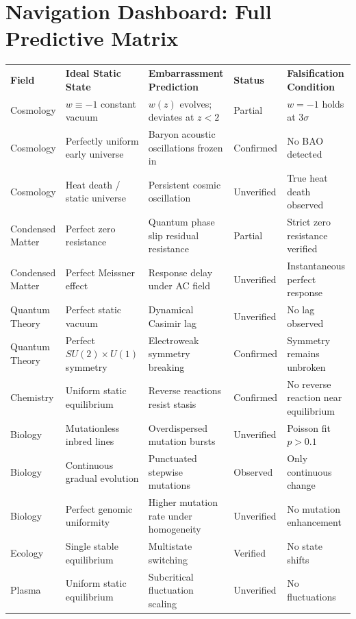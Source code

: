 \documentclass[10pt,a4paper]{article}
\begin{document}
\section*{Navigation Dashboard: Full Predictive Matrix}
\begin{tcolorbox}[title=EMBARRASSMENT PREDICTION DASHBOARD v1.0,colback=white,colframe=black!70,fonttitle=\bfseries\large]
\scriptsize
\renewcommand{\arraystretch}{1.8}
\begin{tabularx}{\textwidth}{LLLLL}
\textbf{Field} & \textbf{Ideal Static State} & \textbf{Embarrassment Prediction} & \textbf{Status} & \textbf{Falsification Condition} \\
Cosmology & $w\equiv-1$ constant vacuum & $w(z)$ evolves; deviates at $z<2$ & Partial & $w=-1$ holds at $3\sigma$ \\
Cosmology & Perfectly uniform early universe & Baryon acoustic oscillations frozen in & Confirmed & No BAO detected \\
Cosmology & Heat death / static universe & Persistent cosmic oscillation & Unverified & True heat death observed \\
Condensed Matter & Perfect zero resistance & Quantum phase slip residual resistance & Partial & Strict zero resistance verified \\
Condensed Matter & Perfect Meissner effect & Response delay under AC field & Unverified & Instantaneous perfect response \\
Quantum Theory & Perfect static vacuum & Dynamical Casimir lag & Unverified & No lag observed \\
Quantum Theory & Perfect $SU(2)\times U(1)$ symmetry & Electroweak symmetry breaking & Confirmed & Symmetry remains unbroken \\
Chemistry & Uniform static equilibrium & Reverse reactions resist stasis & Confirmed & No reverse reaction near equilibrium \\
Biology & Mutationless inbred lines & Overdispersed mutation bursts & Unverified & Poisson fit $p>0.1$ \\
Biology & Continuous gradual evolution & Punctuated stepwise mutations & Observed & Only continuous change \\
Biology & Perfect genomic uniformity & Higher mutation rate under homogeneity & Unverified & No mutation enhancement \\
Ecology & Single stable equilibrium & Multistate switching & Verified & No state shifts \\
Plasma & Uniform static equilibrium & Subcritical fluctuation scaling & Unverified & No fluctuations \\

\end{tabularx}
\end{tcolorbox}
\end{document}
